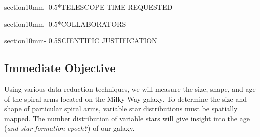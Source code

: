 \documentclass[letterpaper,11pt]{article}
\makeatletter
\renewcommand{\section}{\@startsection%
{section}{1}{0mm}{-\baselineskip}%
{0.5\baselineskip}{\normalfont\Large\bfseries}}%
\makeatother
\begin{document}
\section*{TELESCOPE TIME REQUESTED}

\section*{COLLABORATORS}
\begin{table}[H]\label{tab:collabs}
	\begin{center}
	\end{center}
\end{table}



\section{SCIENTIFIC JUSTIFICATION}

\subsection{Immediate Objective}
Using various data reduction techniques, we will measure the size, shape, and age of the spiral arms located on the Milky Way galaxy. To determine the size and shape of particular spiral arms, variable star distributions must be spatially mapped.  
The number distribution of variable stars will give insight into the age (\textit{and star formation epoch?}) of our galaxy.
\end{document}
